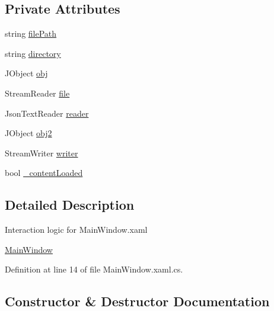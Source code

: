 \subsection*{Private Attributes}
\begin{DoxyCompactItemize}
\item 
string \hyperlink{class_c_p_u___o_s___simulator_1_1_save___file___editor_1_1_main_window_adf51ae9c43bb2cea5d6f9cc79d046ba2}{file\+Path}
\item 
string \hyperlink{class_c_p_u___o_s___simulator_1_1_save___file___editor_1_1_main_window_a8867f09d94a620533db5c8bad03f0c96}{directory}
\item 
J\+Object \hyperlink{class_c_p_u___o_s___simulator_1_1_save___file___editor_1_1_main_window_ac5dbce1cf34490c083f76ec1018b99e9}{obj}
\item 
Stream\+Reader \hyperlink{class_c_p_u___o_s___simulator_1_1_save___file___editor_1_1_main_window_a991061ea935a2bd7571b32b5b2cce64d}{file}
\item 
Json\+Text\+Reader \hyperlink{class_c_p_u___o_s___simulator_1_1_save___file___editor_1_1_main_window_a1656475bf9628e4335781cf30a84d93e}{reader}
\item 
J\+Object \hyperlink{class_c_p_u___o_s___simulator_1_1_save___file___editor_1_1_main_window_a5b79659efbe6c5a5177e7356e870a149}{obj2}
\item 
Stream\+Writer \hyperlink{class_c_p_u___o_s___simulator_1_1_save___file___editor_1_1_main_window_afe228202821ede30538aebda6142f8da}{writer}
\item 
bool \hyperlink{class_c_p_u___o_s___simulator_1_1_save___file___editor_1_1_main_window_a2555c588a1bab654bef42e3a161f6cf6}{\+\_\+content\+Loaded}
\end{DoxyCompactItemize}


\subsection{Detailed Description}
Interaction logic for Main\+Window.\+xaml 

\hyperlink{class_c_p_u___o_s___simulator_1_1_save___file___editor_1_1_main_window}{Main\+Window} 

Definition at line 14 of file Main\+Window.\+xaml.\+cs.



\subsection{Constructor \& Destructor Documentation}
\hypertarget{class_c_p_u___o_s___simulator_1_1_save___file___editor_1_1_main_window_a1049033cf55e7d851b9bd7ca5509cb78}{}
